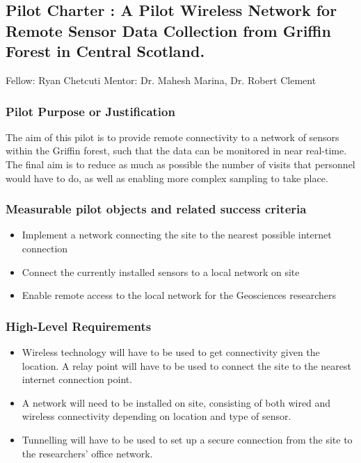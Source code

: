 \documentclass[draftclsnofoot,12pt,journal,onecolumn]{IEEEtran}
\begin{document}
\subsection{Pilot Charter : A Pilot Wireless Network for Remote Sensor Data Collection
from Griffin Forest in Central Scotland.}

Fellow: Ryan Chetcuti
Mentor: Dr. Mahesh Marina, Dr. Robert Clement

\subsubsection{Pilot Purpose or Justification}
The aim of this pilot is to provide remote connectivity to a network of sensors within the Griffin
forest, such that the data can be monitored in near real-time. The final aim is to reduce as much as
possible the number of visits that personnel would have to do, as well as enabling more complex
sampling to take place.

\subsubsection{Measurable pilot objects and related success criteria}
\begin{itemize}
\item Implement a network connecting the site to the nearest possible internet connection
\item Connect the currently installed sensors to a local network on site
\item Enable remote access to the local network for the Geosciences researchers
\end{itemize}

\subsubsection{High-Level Requirements}
\begin{itemize}
\item Wireless technology will have to be used to get connectivity given the location. A relay
point will have to be used to connect the site to the nearest internet connection point.
\item A network will need to be installed on site, consisting of both wired and wireless
connectivity depending on location and type of sensor.
\item Tunnelling will have to be used to set up a secure connection from the site to the researchers'
office network.
\end{itemize}
\end{document}
